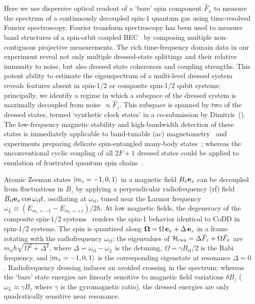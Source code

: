 \documentclass[aps,prl,reprint,superscriptaddress,floatfix]{revtex4-1}
\begin{document}
Here we use dispersive optical readout of a `bare' spin component $\hat{F}_x$ to measure the spectrum of a continuously decoupled spin-1 quantum gas using time-resolved Fourier spectroscopy. 
Fourier transform spectroscopy has been used to measure band structures of a spin-orbit coupled BEC~\cite{valdes-curiel_fourier_2017} by composing multiple non-contiguous projective measurements.
The rich time-frequency domain data in our experiment reveal not only multiple dressed-state splittings and their relative immunity to noise, but also dressed state coherences and coupling strengths.
This potent ability to estimate the eigenspectrum of a multi-level dressed system reveals features absent in spin-1/2 or composite spin-1/2 qubit systems; principally, we identify a regime in which a subspace of the dressed system is maximally decoupled from noise $\propto \hat{F}_z$.
This subspace is spanned by two of the dressed states, termed `synthetic clock states' in a co-submission by Dimitris~\etal (\dimitris).
The low-frequency magnetic stability and high-bandwidth detection of these states is immediately applicable to band-tunable (ac) magnetometry~\cite{hirose_continuous_2012,loretz_radio-frequency_2013,ockeloen_quantum_2013,*horsley_frequency-tunable_2016} and experiments preparing delicate spin-entangled many-body states~\cite{stamper-kurn_spinor_2013}; whereas the unconventional cyclic coupling of all $2F+1$ dressed states could be applied to emulation of frustrated quantum spin chains~\cite{mikeska_one-dimensional_2004}.

Atomic Zeeman states $\vert m_z=-1,0,1 \rangle $ in a magnetic field $B_z \mathbf{e}_z$ can be decoupled from fluctuations in $B_z$ by applying a perpendicular radiofrequency (rf) field $B_{\text{rf}} \mathbf{e}_x \cos \omega_\text{rf} t$, oscillating at $\omega_\text{rf}$, tuned near the Larmor frequency $\omega_L \equiv (E_{m_z=-1}-E_{m_z=+1})/2\hbar$.
At low magnetic fields, the degeneracy of the composite spin-$1/2$ systems~\cite{majorana_atomi_1932} renders the spin-1 behavior identical to CoDD in spin-$1/2$ systems.
The spin is quantized along $\mathbf{\Omega} = \Omega \, \mathbf{e}_x + \Delta \, \mathbf{e}_z$ in a frame rotating with the radiofrequency $\omega_{\text{rf}}$; the eigenvalues of $\mathcal{H}_{\text{rwa}} = \Delta \hat{F}_z + \Omega \hat{F}_x$ are $m_x \hbar \sqrt{\Omega^2 + \Delta^2}$, where $\Delta = \omega_{\text{rf}}-\omega_L$ is the detuning, $\Omega = \gamma B_{\text{rf}} / 2$ is the Rabi frequency, and $\vert m_x=-1,0,1 \rangle $ is the corresponding eigenstate at resonance $\Delta=0$.
Radiofrequency dressing induces an avoided crossing in the spectrum; whereas the `bare' state energies are linearly sensitive to magnetic field variations $\delta B_z$ ($\omega_L \approx \gamma B_z$ where $\gamma$ is the gyromagnetic ratio), the dressed energies are only quadratically sensitive near resonance.
\end{document}
